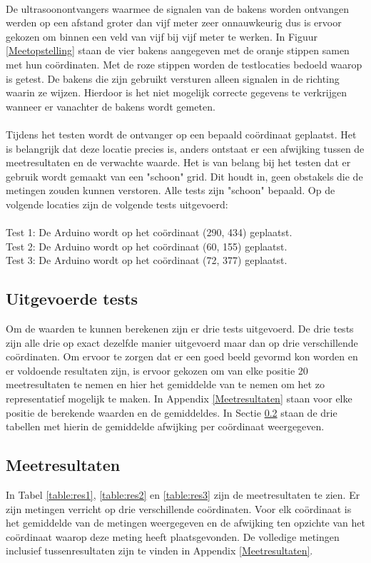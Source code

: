 \documentclass{article}
\begin{document}
\\
De ultrasoonontvangers waarmee de signalen van de bakens worden ontvangen werden op een afstand groter dan vijf meter zeer onnauwkeurig dus is ervoor gekozen om binnen een veld van vijf bij vijf meter te werken. In Figuur \ref{Meetopstelling} staan de vier bakens aangegeven met de oranje stippen samen met hun co\"{o}rdinaten. Met de roze stippen worden de testlocaties bedoeld waarop is getest. De bakens die zijn gebruikt versturen alleen signalen in de richting waarin ze wijzen. Hierdoor is het niet mogelijk correcte gegevens te verkrijgen wanneer er vanachter de bakens wordt gemeten. \\
\\
Tijdens het testen wordt de ontvanger op een bepaald co\"{o}rdinaat geplaatst. Het is belangrijk dat deze locatie precies is, anders ontstaat er een afwijking tussen de meetresultaten en de verwachte waarde. 
Het is van belang bij het testen dat er gebruik wordt gemaakt van een "schoon" grid. Dit houdt in, geen obstakels die de metingen zouden kunnen verstoren. Alle tests zijn "schoon"  bepaald. 
Op de volgende locaties zijn de volgende tests uitgevoerd:\\
\\
\indent Test 1: De Arduino wordt op het co\"{o}rdinaat (290, 434) geplaatst. \\
\indent Test 2: De Arduino wordt op het co\"{o}rdinaat (60, 155) geplaatst. \\
\indent Test 3: De Arduino wordt op het co\"{o}rdinaat (72, 377) geplaatst. 

\subsection{Uitgevoerde tests}
Om de waarden te kunnen berekenen zijn er drie tests uitgevoerd. De drie tests zijn alle drie op exact dezelfde manier uitgevoerd maar dan op drie verschillende co\"{o}rdinaten. Om ervoor te zorgen dat er een goed beeld gevormd kon worden en er voldoende resultaten zijn, is ervoor gekozen om van elke positie 20 meetresultaten te nemen en hier het gemiddelde van te nemen om het zo representatief mogelijk te maken. In Appendix \ref{Meetresultaten} staan voor elke positie de berekende waarden en de gemiddeldes. In Sectie \ref{gemiddeldes} staan de drie tabellen met hierin de gemiddelde afwijking per co\"{o}rdinaat weergegeven.

\subsection{Meetresultaten}
\label{gemiddeldes}
In Tabel \ref{table:res1}, \ref{table:res2} en \ref{table:res3} zijn de meetresultaten te zien. Er zijn  metingen verricht op drie verschillende co\"ordinaten. Voor elk co\"ordinaat is het gemiddelde van de metingen weergegeven en de afwijking ten opzichte van het co\"ordinaat waarop deze meting heeft plaatsgevonden. De volledige metingen inclusief tussenresultaten zijn te vinden in Appendix \ref{Meetresultaten}.
\end{document}
